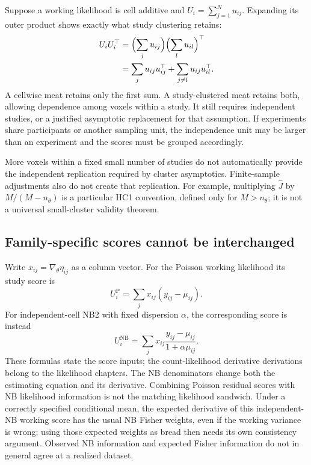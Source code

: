 Suppose a working likelihood is cell additive and
$U_i=\sum_{j=1}^N u_{ij}$.  Expanding its outer product shows exactly
what study clustering retains:
\begin{align}
 U_iU_i^\top
 &=\Bigl(\sum_j u_{ij}\Bigr)\Bigl(\sum_lu_{il}\Bigr)^\top\\
 &=\sum_j u_{ij}u_{ij}^\top
       +\sum_{j\ne l}u_{ij}u_{il}^\top .
 \label{cov-cluster-cross-terms}
\end{align}
A cellwise meat retains only the first sum.  A study-clustered meat
retains both, allowing dependence among voxels within a study.  It still
requires independent studies, or a justified asymptotic replacement for
that assumption.  If experiments share participants or another sampling
unit, the independence unit may be larger than an experiment and the
scores must be grouped accordingly.

More voxels within a fixed small number of studies do not automatically
provide the independent replication required by cluster asymptotics.
Finite-sample adjustments also do not create that replication.  For
example, multiplying $\widehat J$ by $M/(M-n_\theta)$ is a particular
HC1 convention, defined only for $M>n_\theta$; it is not a universal
small-cluster validity theorem.

\subsection{Family-specific scores cannot be interchanged}
\label{cov-family-scores}

Write $x_{ij}=\nabla_\theta\eta_{ij}$ as a column vector.  For the
Poisson working likelihood its study score is
\[
 U_i^{\mathrm P}=\sum_jx_{ij}(y_{ij}-\mu_{ij}).
\]
For independent-cell NB2 with fixed dispersion $\alpha$, the corresponding
score is instead
\[
 U_i^{\mathrm{NB}}=\sum_jx_{ij}
                  \frac{y_{ij}-\mu_{ij}}{1+\alpha\mu_{ij}} .
\]
These formulas state the score inputs; the count-likelihood derivative
derivations belong to the likelihood chapters.  The NB denominators
change both the estimating equation and its derivative.  Combining
Poisson residual scores with NB likelihood information is not the
matching likelihood sandwich.  Under a correctly specified conditional
mean, the expected derivative of this independent-NB working score
has the usual NB Fisher weights, even if the working variance is wrong;
using those expected weights as bread then needs its own consistency
argument.  Observed NB information and expected Fisher information do
not in general agree at a realized dataset.

